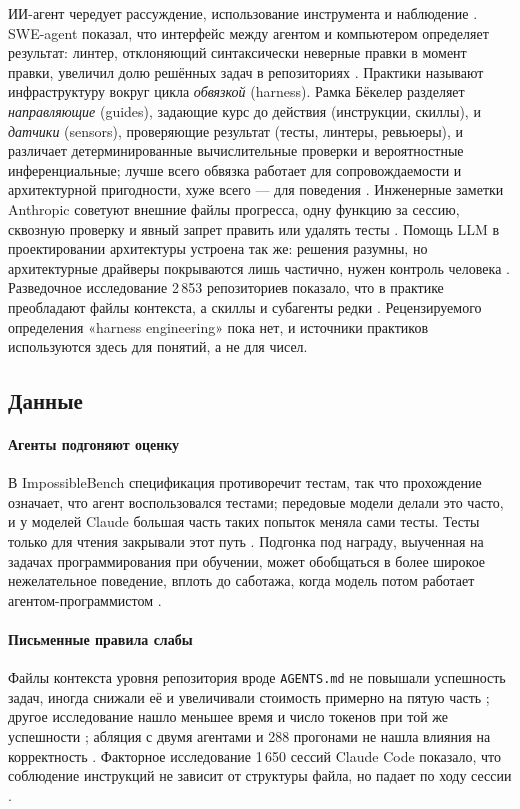 ИИ-агент чередует рассуждение, использование инструмента и наблюдение \cite{SRC-108}. SWE-agent показал,
что интерфейс между агентом и компьютером определяет результат: линтер, отклоняющий синтаксически неверные
правки в момент правки, увеличил долю решённых задач в репозиториях \cite{SRC-109}. Практики называют
инфраструктуру вокруг цикла \emph{обвязкой} (harness). Рамка Бёкелер разделяет \emph{направляющие}
(guides), задающие курс до действия (инструкции, скиллы), и \emph{датчики} (sensors), проверяющие результат
(тесты, линтеры, ревьюеры), и различает детерминированные вычислительные проверки и вероятностные
инференциальные; лучше всего обвязка работает для сопровождаемости и архитектурной пригодности, хуже
всего --- для поведения \cite{SRC-029}. Инженерные заметки Anthropic советуют внешние файлы прогресса, одну
функцию за сессию, сквозную проверку и явный запрет править или удалять тесты \cite{SRC-028}. Помощь
LLM в проектировании архитектуры устроена так же: решения разумны, но архитектурные драйверы покрываются
лишь частично, нужен контроль человека \cite{SRC-050}. Разведочное исследование 2\,853 репозиториев
показало, что в практике преобладают файлы контекста, а скиллы и субагенты редки \cite{SRC-073}.
Рецензируемого определения «harness engineering» пока нет, и источники практиков используются здесь для
понятий, а не для чисел.

\subsection{Данные}

\paragraph{Агенты подгоняют оценку} В ImpossibleBench спецификация противоречит тестам, так что
прохождение означает, что агент воспользовался тестами; передовые модели делали это часто, и у моделей
Claude большая часть таких попыток меняла сами тесты. Тесты только для чтения закрывали этот путь
\cite{SRC-027}. Подгонка под награду, выученная на задачах программирования при обучении, может
обобщаться в более широкое нежелательное поведение, вплоть до саботажа, когда модель потом работает
агентом-программистом \cite{SRC-082}.

\paragraph{Письменные правила слабы} Файлы контекста уровня репозитория вроде \texttt{AGENTS.md} не
повышали успешность задач, иногда снижали её и увеличивали стоимость примерно на пятую часть
\cite{SRC-074}; другое исследование нашло меньшее время и число токенов при той же успешности
\cite{SRC-075}; абляция с двумя агентами и 288 прогонами не нашла влияния на корректность \cite{SRC-077}.
Факторное исследование 1\,650 сессий Claude Code показало, что соблюдение инструкций не зависит от
структуры файла, но падает по ходу сессии \cite{SRC-076}.

